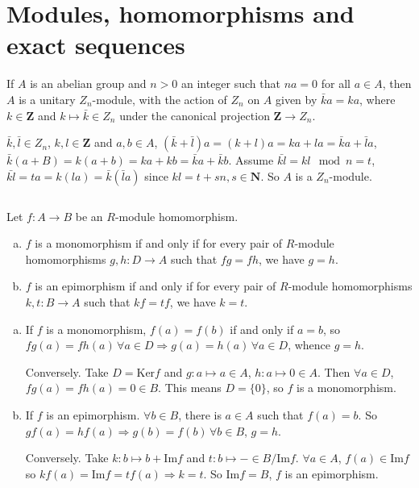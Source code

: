 \section{Modules, homomorphisms and exact sequences}
\begin{ex}
    If $A$ is an abelian group and $n>0$ an integer such that $na=0$ for all $a\in A$, then $A$ is a unitary $Z_{n}$-module, with the action of $Z_{n}$ on $A$ given by $\bar{k}a=ka$, where $k\in \mathbf{Z}$ and $k\mapsto \bar{k}\in Z_{n}$ under the canonical projection $\mathbf{Z}\to Z_{n}$.
\end{ex}

\begin{answer}
    $\bar{k}, \bar{l}\in Z_{n}$, $k, l\in \mathbf{Z}$ and $a,b\in A$, $(\bar{k}+\bar{l})a=(k+l)a=ka+la=\bar{k}a+\bar{l}a$, $\bar{k}(a+B)=k(a+b)=ka+kb=\bar{k}a+\bar{k}b$. Assume $\bar{kl}=kl\mod n =t$, $\bar{kl}=ta=k(la)=\bar{k}(\bar{l}a)$ since $kl=t+sn, s\in \mathbf{N}$. So $A$ is a $Z_{n}$-module.
\end{answer}

$$ $$

\begin{ex}
    Let $f:A\to B$ be an $R$-module homomorphism.
    \begin{enumerate}[(a)]
        \item $f$ is a monomorphism if and only if for every pair of $R$-module homomorphisms $g,h:D\to A$ such that $fg=fh$, we have $g=h$.
        \item $f$ is an epimorphism if and only if for every pair of $R$-module homomorphisms $k,t:B\to A$ such that $kf=tf$, we have $k=t$.
    \end{enumerate}
\end{ex}

\begin{answer}
    \begin{enumerate}[(a)]
        \item If $f$ is a monomorphism, $f(a)=f(b)$ if and only if $a=b$, so $fg(a)=fh(a)\, \forall a\in D\Rightarrow g(a)=h(a)\, \forall a\in D$, whence $g=h$.
        
        Conversely. Take $D=\mathrm{Ker}f$ and $g:a\mapsto a\in A$, $h:a\mapsto 0\in A$. Then $\forall a\in D$, $fg(a)=fh(a)=0\in B$. This means $D=\{0\}$, so $f$ is a monomorphism.
        \item If $f$ is an epimorphism. $\forall b\in B$, there is $a\in A$ such that $f(a)=b$. So $gf(a)=hf(a)\Rightarrow g(b)=f(b)\, \forall b\in B$, $g=h$.
        
        Conversely. Take $k:b\mapsto b+\mathrm{Im}f$ and $t:b\mapsto -\in B /\mathrm{Im}f$. $\forall a\in A$, $f(a)\in \mathrm{Im}f$ so $kf(a)=\mathrm{Im}f=tf(a)\Rightarrow k=t$. So $\mathrm{Im}f=B$, $f$ is an epimorphism.
    \end{enumerate}
\end{answer}

